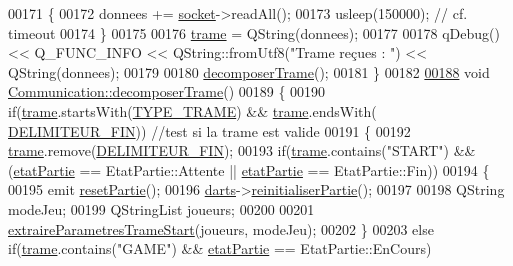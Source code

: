 \begin{DoxyCode}
00171     \{
00172         donnees += \hyperlink{class_communication_aa4ddc3151b305db0135d5826384645cc}{socket}->readAll();
00173         usleep(150000); \textcolor{comment}{// cf. timeout}
00174     \}
00175 
00176     \hyperlink{class_communication_ac8f5004bfaaf7f538ba5ae93255f772b}{trame} = QString(donnees);
00177 
00178     qDebug() << Q\_FUNC\_INFO << QString::fromUtf8(\textcolor{stringliteral}{"Trame reçues : "}) << QString(donnees);
00179 
00180     \hyperlink{class_communication_aaf5333662717e69837d2d39164e5a303}{decomposerTrame}();
00181 \}
00182 
\hyperlink{class_communication_aaf5333662717e69837d2d39164e5a303}{00188} \textcolor{keywordtype}{void} \hyperlink{class_communication_aaf5333662717e69837d2d39164e5a303}{Communication::decomposerTrame}()
00189 \{
00190     \textcolor{keywordflow}{if}(\hyperlink{class_communication_ac8f5004bfaaf7f538ba5ae93255f772b}{trame}.startsWith(\hyperlink{communication_8h_a8da23fa25560c54c52884746a5d1cc69}{TYPE\_TRAME}) && \hyperlink{class_communication_ac8f5004bfaaf7f538ba5ae93255f772b}{trame}.endsWith(
      \hyperlink{communication_8h_aafcc0c7b4996f7783c9f4e766a233487}{DELIMITEUR\_FIN})) \textcolor{comment}{//test si la trame est valide}
00191     \{
00192         \hyperlink{class_communication_ac8f5004bfaaf7f538ba5ae93255f772b}{trame}.remove(\hyperlink{communication_8h_aafcc0c7b4996f7783c9f4e766a233487}{DELIMITEUR\_FIN});
00193         \textcolor{keywordflow}{if}(\hyperlink{class_communication_ac8f5004bfaaf7f538ba5ae93255f772b}{trame}.contains(\textcolor{stringliteral}{"START"}) && (\hyperlink{class_communication_a2539ded2780db2c732690c585c768c96}{etatPartie} == EtatPartie::Attente || 
      \hyperlink{class_communication_a2539ded2780db2c732690c585c768c96}{etatPartie} == EtatPartie::Fin))      
00194         \{
00195             emit \hyperlink{class_communication_af79d126304cca4281db4624b1b457ade}{resetPartie}();
00196             \hyperlink{class_communication_a494d609c206472041468e362d7cfc0e5}{darts}->\hyperlink{class_darts_a70c68ed8bd56b63df203c25e6ed14f3b}{reinitialiserPartie}();
00197 
00198             QString modeJeu;
00199             QStringList joueurs;
00200 
00201             \hyperlink{class_communication_a31f998e3410e7a1d9e65a05a5d51a9b9}{extraireParametresTrameStart}(joueurs, modeJeu);
00202         \}
00203         \textcolor{keywordflow}{else} \textcolor{keywordflow}{if}(\hyperlink{class_communication_ac8f5004bfaaf7f538ba5ae93255f772b}{trame}.contains(\textcolor{stringliteral}{"GAME"}) && \hyperlink{class_communication_a2539ded2780db2c732690c585c768c96}{etatPartie} == EtatPartie::EnCours)      

\end{DoxyCode}

